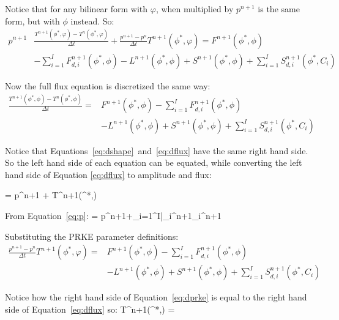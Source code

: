Notice that for any bilinear form with $\varphi$, when multiplied by $p^{n+1}$ is the same form, but with $\phi$ instead. So:
\begin{align}
p^{n+1}&\frac{T^{n+1}(\phi^{*},\varphi)-T^{n}(\phi^{*},\varphi)}{\Delta t} + \frac{p^{n+1} - p^n}{\Delta t}T^{n+1}(\phi^{*},\varphi)= F^{n+1}(\phi^{*},\phi)  \nonumber \\
&- \sum_{i=1}^I F_{d,i}^{n+1}(\phi^{*},\phi) - L^{n+1}(\phi^{*},\phi) + S^{n+1}(\phi^{*},\phi) + \sum_{i=1}^I S_{d,i}^{n+1}(\phi^{*},C_i)
\label{eq:dshape}
\end{align}

Now the full flux equation is discretized the same way:
\begin{align}
\frac{T^{n+1}(\phi^{*},\phi)-T^{n}(\phi^{*},\phi)}{\Delta t} =& F^{n+1}(\phi^{*},\phi)- \sum_{i=1}^I F_{d,i}^{n+1}(\phi^{*},\phi) \nonumber \\
& - L^{n+1}(\phi^{*},\phi) + S^{n+1}(\phi^{*},\phi) + \sum_{i=1}^I S_{d,i}^{n+1}(\phi^{*},C_i)
\label{eq:dflux}
\end{align}

Notice that Equations~\ref{eq:dshape}~and~\ref{eq:dflux} have the same right hand side. So the left hand side of each equation can be equated, while converting the left hand side of Equation \ref{eq:dflux} to amplitude and flux:

\be
{} = p^{n+1} + T^{n+1}(\phi^{*},\varphi)
\label{eq:neq}
\ee

From Equation~\ref{eq:p}:
\be
{} = p^{n+1}+\sum_{i=1}^I\bar{\lambda}_i^{n+1}\xi_i^{n+1}
\ee

Substituting the PRKE parameter definitions:
\begin{align}
\frac{p^{n+1} - p^n}{\Delta t} T^{n+1}(\phi^{*},\varphi) =& F^{n+1}(\phi^{*},\phi)- \sum_{i=1}^I F_{d,i}^{n+1}(\phi^{*},\phi) \nonumber \\
& - L^{n+1}(\phi^{*},\phi) + S^{n+1}(\phi^{*},\phi) + \sum_{i=1}^I S_{d,i}^{n+1}(\phi^{*},C_i)
\label{eq:dprke}
\end{align}

Notice how the right hand side of Equation~\ref{eq:dprke} is equal to the right hand side of Equation~\ref{eq:dflux} so:
\be
{} T^{n+1}(\phi^{*},\varphi) = 
\ee

